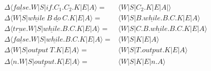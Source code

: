 \begin{enumerate}
\begin{itemize}
\begin{align*}
\Delta\langle \underline{false}.W|S|\underline{if}.C_1.C_2.K|E|A\rangle = & \langle W|S|C_2.K|E|A|\rangle \\
\Delta\langle W|S|\underline{while}\ B\ \underline{do}\ C.K|E|A\rangle = & \langle W|S|B.\underline{while}.B.C.K|E|A\rangle \\
\Delta\langle \underline{true}.W|S|\underline{while}.B.C.K|E|A\rangle = & \langle W|S|C.B.\underline{while}.B.C.K|E|A\rangle \\
\Delta\langle \underline{false}.W|S|\underline{while}.B.C.K|E|A\rangle = & \langle W|S|K|E|A\rangle \\
\Delta\langle W|S|\underline{output}\ T.K|E|A\rangle = & \langle W|S|T.\underline{output}.K|E|A\rangle \\
\Delta\langle n.W|S|\underline{output}.K|E|A\rangle = & \langle W|S|K|E|n.A\rangle \\
\end{align*}
	\end{itemize}

\end{enumerate}




